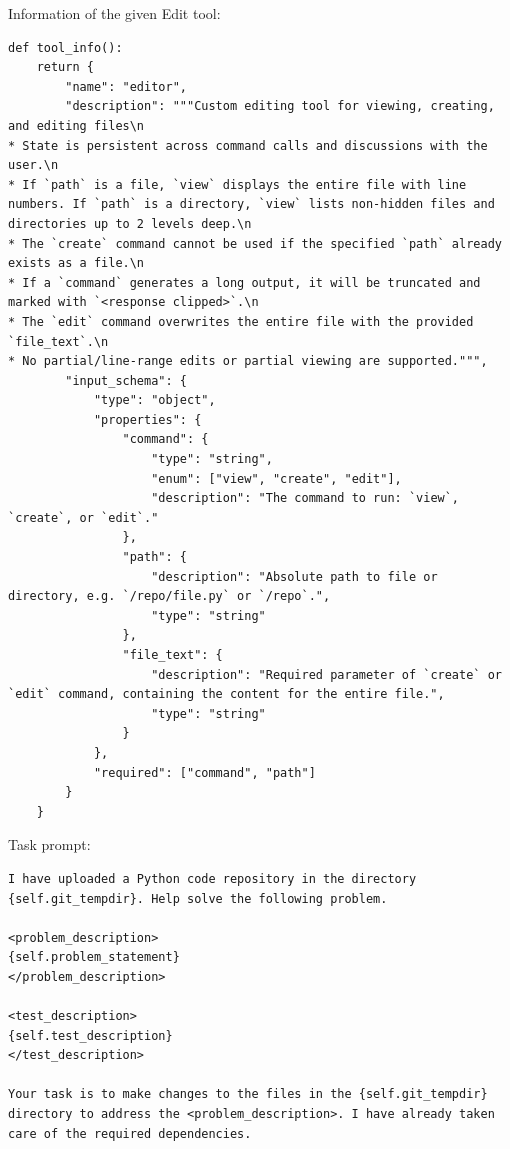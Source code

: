 \documentclass{article} %
\begin{document}
Information of the given Edit tool:

\begin{lstlisting}
def tool_info():
    return {
        "name": "editor",
        "description": """Custom editing tool for viewing, creating, and editing files\n
* State is persistent across command calls and discussions with the user.\n
* If `path` is a file, `view` displays the entire file with line numbers. If `path` is a directory, `view` lists non-hidden files and directories up to 2 levels deep.\n
* The `create` command cannot be used if the specified `path` already exists as a file.\n
* If a `command` generates a long output, it will be truncated and marked with `<response clipped>`.\n
* The `edit` command overwrites the entire file with the provided `file_text`.\n
* No partial/line-range edits or partial viewing are supported.""",
        "input_schema": {
            "type": "object",
            "properties": {
                "command": {
                    "type": "string",
                    "enum": ["view", "create", "edit"],
                    "description": "The command to run: `view`, `create`, or `edit`."
                },
                "path": {
                    "description": "Absolute path to file or directory, e.g. `/repo/file.py` or `/repo`.",
                    "type": "string"
                },
                "file_text": {
                    "description": "Required parameter of `create` or `edit` command, containing the content for the entire file.",
                    "type": "string"
                }
            },
            "required": ["command", "path"]
        }
    }
\end{lstlisting}


Task prompt:

\begin{lstlisting}
I have uploaded a Python code repository in the directory {self.git_tempdir}. Help solve the following problem.

<problem_description>
{self.problem_statement}
</problem_description>

<test_description>
{self.test_description}
</test_description>

Your task is to make changes to the files in the {self.git_tempdir} directory to address the <problem_description>. I have already taken care of the required dependencies.
\end{lstlisting}
\end{document}
